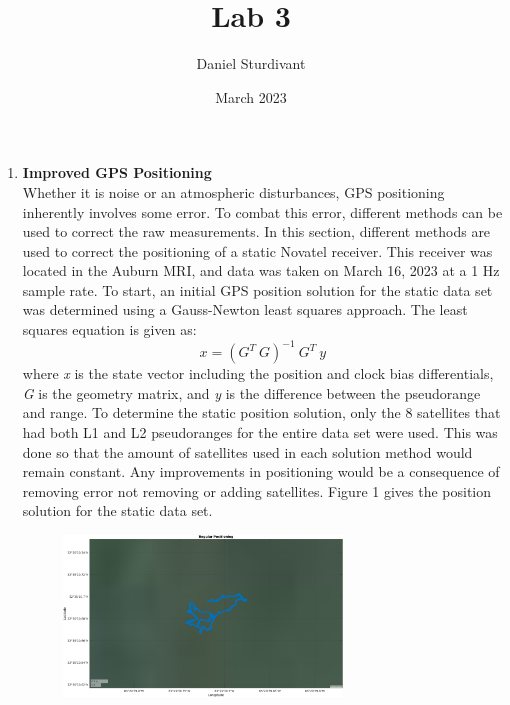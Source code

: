 \documentclass[11pt]{article}
\author{Daniel Sturdivant}
\title{Lab 3}
\date{March 2023}
\begin{document}
\maketitle
\thispagestyle{fancy}
\setlength{\parindent}{0pt}

\begin{enumerate}[label=\textbf{\arabic*.}]
  \itemsep 24pt
  \item \textbf{Improved GPS Positioning} \\
Whether it is noise or an atmospheric disturbances, GPS positioning inherently involves some error. To combat this error, different methods
can be used to correct the raw measurements. In this section, different methods are used to correct the positioning of a static Novatel receiver. 
This receiver was located in the Auburn MRI, and data was taken on March 16, 2023 at a 1 Hz sample rate. To start, an initial GPS position 
solution for the static data set was determined using a Gauss-Newton least squares approach. The least squares equation is given as:
    \begin{equation}
          x =(G^T\ G)^{-1}\ G^T\ y
    \end{equation}
  where \textit{x} is the state vector including the position and clock bias differentials, \textit{G} is the geometry matrix, and \textit{y} is 
  the difference between the pseudorange and range. To determine the static position solution, only the 8 satellites that had both L1 and L2 
  pseudoranges for the entire data set were used. This was done so that the amount of satellites used in each solution method would remain 
  constant. Any improvements in positioning would be a consequence of removing error not removing or adding satellites. Figure 1 gives the position solution for the static data set. 
    \begin{figure}[H]
        \centering
        \includegraphics[width=0.7\textwidth]{p1_a.png}

\end{figure}
\end{enumerate}
\end{document}
